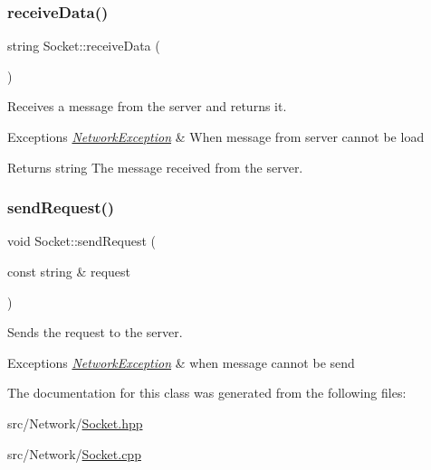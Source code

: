 \subsubsection{\texorpdfstring{receive\+Data()}{receiveData()}}
{\footnotesize\ttfamily string Socket\+::receive\+Data (\begin{DoxyParamCaption}{ }\end{DoxyParamCaption})\hspace{0.3cm}{\ttfamily [static]}}

Receives a message from the server and returns it. 
\begin{DoxyExceptions}{Exceptions}
{\em \hyperlink{class_network_exception}{Network\+Exception}} & When message from server cannot be load \\
\hline
\end{DoxyExceptions}
\begin{DoxyReturn}{Returns}
string The message received from the server. 
\end{DoxyReturn}
\hypertarget{class_socket_a23669198a36df9525a6248d7650661e4}{}\label{class_socket_a23669198a36df9525a6248d7650661e4} 
\subsubsection{\texorpdfstring{send\+Request()}{sendRequest()}}
{\footnotesize\ttfamily void Socket\+::send\+Request (\begin{DoxyParamCaption}\item[{const string \&}]{request }\end{DoxyParamCaption})\hspace{0.3cm}{\ttfamily [static]}}

Sends the request to the server. 
\begin{DoxyExceptions}{Exceptions}
{\em \hyperlink{class_network_exception}{Network\+Exception}} & when message cannot be send \\
\hline
\end{DoxyExceptions}


The documentation for this class was generated from the following files\+:\begin{DoxyCompactItemize}
\item 
src/\+Network/\hyperlink{_socket_8hpp}{Socket.\+hpp}\item 
src/\+Network/\hyperlink{_socket_8cpp}{Socket.\+cpp}\end{DoxyCompactItemize}
